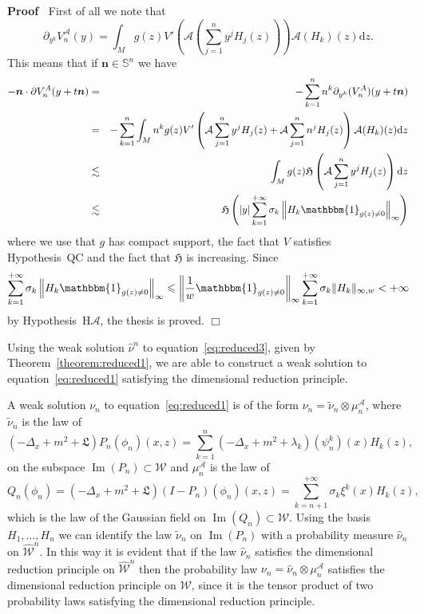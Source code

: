 \documentclass[a4paper,10pt]{article}
\newcommand{\mathd}{\mathrm{d}}
\newcommand{\tmmathbf}[1]{\ensuremath{\boldsymbol{#1}}}
\newcommand{\tmop}[1]{\ensuremath{\operatorname{#1}}}
\newenvironment{proof}{\noindent\textbf{Proof\ }}{\hspace*{\fill}$\Box$\medskip}
\begin{document}
\begin{proof}
  First of all we note that
  \[ \partial_{y^k} V^{\mathcal{A}}_n (y) = \int_M g (z) V' \left( \mathcal{}
     \mathcal{A} \left( \sum_{j = 1}^n y^j H_j (z) \right) \right) \mathcal{A}
     (H_k) (z) \mathd z. \]
  This means that if $\tmmathbf{n} \in \mathbb{S}^n$ we have
  \begin{eqnarray}
    -\tmmathbf{n} \cdot \partial V_n^A (y + t\tmmathbf{n}) & = & - \sum_{k =
    1}^n n^k \partial_{y^k} (V_n^A) (y + t\tmmathbf{n}) \nonumber\\
    & = & - \sum_{k = 1}^n \int_M n^k g (z) V' \left( \mathcal{A} \sum_{j =
    1}^n y^j H_j (z) + \mathcal{A} \sum_{j = 1}^n n^j H_j (z) \right)
    \mathcal{A} (H_k) (z) \mathd z \nonumber\\
    & \lesssim & \int_M g (z) \mathfrak{H} \left( \mathcal{A} \sum_{j = 1}^n
    y^j H_j (z) \right) \mathd z \nonumber\\
    & \lesssim & \mathfrak{H} \left( | y | \sum_{k = 1}^{+ \infty} \sigma_k
    \left\| H_k \mathbbm{1}_{g (z) \not{=} 0} \right\|_{\infty} \right)
    \nonumber
  \end{eqnarray}
  where we use that $g$ has compact support, the fact that $V$ satisfies
  Hypothesis~QC and the fact that $\mathfrak{H}$ is increasing. Since
  \[ \sum_{k = 1}^{+ \infty} \sigma_k \left\| H_k \mathbbm{1}_{g (z) \not{=}
     0} \right\|_{\infty} \leqslant \left\| \frac{1}{w} \mathbbm{1}_{g (z)
     \not{=} 0} \right\|_{\infty} \sum_{k = 1}^{+ \infty} \sigma_k \| H_k
     \|_{\infty, w} < + \infty \]
  by Hypothesis~H$\mathcal{A}$, the thesis is proved.
\end{proof}

Using the weak solution $\hat{\nu}^n$ to equation~{\eqref{eq:reduced3}}, given
by Theorem~\ref{theorem:reduced1}, we are able to construct a weak solution to
equation~{\eqref{eq:reduced1}} satisfying the dimensional reduction principle.

A weak solution $\nu_n$ to equation~{\eqref{eq:reduced1}} is of the form
$\nu_n = \tilde{\nu}_n \otimes \mu_n^{\mathcal{A}}$, where $\tilde{\nu}_n$ is
the law of
\[ (- \Delta_x + m^2 + \mathfrak{L}) P_n (\phi_n) (x, z) = \sum_{k = 1}^n (-
   \Delta_x + m^2 + \lambda_k) (\psi^k_n) (x) H_k (z), \]
on the subspace $\tmop{Im} (P_n) \subset \mathcal{W}$ and
$\mu_n^{\mathcal{A}}$ is the law of
\[ Q_n (\phi_n) = (- \Delta_x + m^2 + \mathfrak{L}) (I - P_n) (\phi_n) (x, z)
   = \sum_{k = n + 1}^{+ \infty} \mathcal{} \sigma_k \xi^k (x) H_k (z), \]
which is the law of the Gaussian field on $\tmop{Im} (Q_n) \subset
\mathcal{W}$. Using the basis $H_1, \ldots, H_n$ we can identify the law
$\tilde{\nu}_n$ on $\tmop{Im} (P_n)$ with a probability measure $\hat{\nu}_n$
on $\widehat{\mathcal{W}}^n$. In this way it is evident that if the law
$\hat{\nu}_n$ satisfies the dimensional reduction principle on
$\widehat{\mathcal{W}}^n$ then the probability law $\nu_n = \hat{\nu}_n
\otimes \mu_n^{\mathcal{A}}$ satisfies the dimensional reduction principle on
$\mathcal{W}$, since it is the tensor product of two probability laws
satisfying the dimensional reduction principle.
\end{document}
